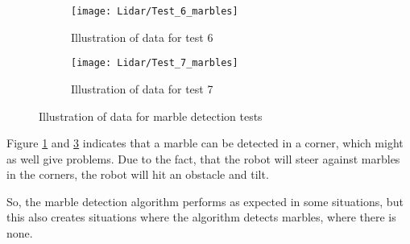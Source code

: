 \documentclass[../Head/Main.tex]{subfiles}
\begin{document}
\begin{figure}[H]
  \begin{subfigure}[b]{0.5\textwidth}
  	\centering
    \texttt{[image: Lidar/Test\_6\_marbles]}
    \caption{Illustration of data for test 6}
    \label{fig:MarbleTest6}
  \end{subfigure}
  \hfill
  \begin{subfigure}[b]{0.5\textwidth}
  	\centering
    \texttt{[image: Lidar/Test\_7\_marbles]}
    \caption{Illustration of data for test 7}
    \label{fig:MarbleTest7}
  \end{subfigure}
  \caption{Illustration of data for marble detection tests}
\end{figure}
Figure \ref{fig:MarbleTest6} and \ref{fig:MarbleTest7} indicates that a marble can be detected in a corner, which might as well give problems. Due to the fact, that the robot will steer against marbles in the corners, the robot will hit an obstacle and tilt.\par
So, the marble detection algorithm performs as expected in some situations, but this also creates situations where the algorithm detects marbles, where there is none. 
\end{document}
